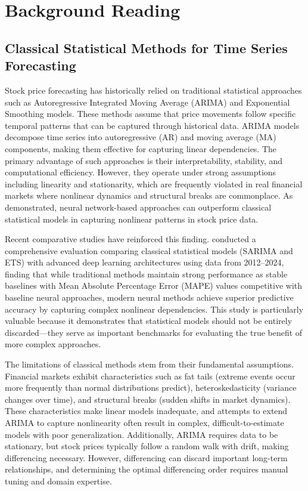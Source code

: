 \chapter{Background Reading}

\section{Classical Statistical Methods for Time Series Forecasting}

Stock price forecasting has historically relied on traditional statistical approaches such as Autoregressive Integrated Moving Average (ARIMA) and Exponential Smoothing models. These methods assume that price movements follow specific temporal patterns that can be captured through historical data. ARIMA models decompose time series into autoregressive (AR) and moving average (MA) components, making them effective for capturing linear dependencies. The primary advantage of such approaches is their interpretability, stability, and computational efficiency. However, they operate under strong assumptions including linearity and stationarity, which are frequently violated in real financial markets where nonlinear dynamics and structural breaks are commonplace. As \cite{lawrence1997nnstock} demonstrated, neural network-based approaches can outperform classical statistical models in capturing nonlinear patterns in stock price data.

Recent comparative studies have reinforced this finding. \cite{appliedmath5040176} conducted a comprehensive evaluation comparing classical statistical models (SARIMA and ETS) with advanced deep learning architectures using data from 2012–2024, finding that while traditional methods maintain strong performance as stable baselines with Mean Absolute Percentage Error (MAPE) values competitive with baseline neural approaches, modern neural methods achieve superior predictive accuracy by capturing complex nonlinear dependencies. This study is particularly valuable because it demonstrates that statistical models should not be entirely discarded—they serve as important benchmarks for evaluating the true benefit of more complex approaches.

The limitations of classical methods stem from their fundamental assumptions. Financial markets exhibit characteristics such as fat tails (extreme events occur more frequently than normal distributions predict), heteroskedasticity (variance changes over time), and structural breaks (sudden shifts in market dynamics). These characteristics make linear models inadequate, and attempts to extend ARIMA to capture nonlinearity often result in complex, difficult-to-estimate models with poor generalization. Additionally, ARIMA requires data to be stationary, but stock prices typically follow a random walk with drift, making differencing necessary. However, differencing can discard important long-term relationships, and determining the optimal differencing order requires manual tuning and domain expertise.

